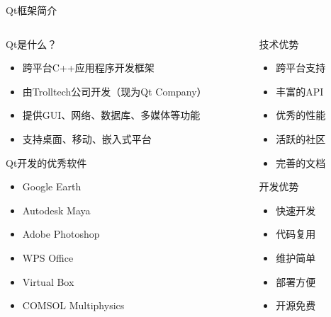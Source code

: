 \documentclass[UTF8,aspectratio=169]{beamer}
\begin{document}
\begin{frame}{Qt框架简介}
    \begin{columns}
        \begin{column}{0.58\textwidth}
    \begin{ytublock}{Qt是什么？}
        \begin{itemize}
            \item 跨平台C++应用程序开发框架
            \item 由Trolltech公司开发（现为Qt Company）
            \item 提供GUI、网络、数据库、多媒体等功能
            \item 支持桌面、移动、嵌入式平台
        \end{itemize}
    \end{ytublock}
    \begin{ytublock}{Qt开发的优秀软件}
        \begin{itemize}
            \item Google Earth
            \item Autodesk Maya
            \item Adobe Photoshop
            \item WPS Office
            \item Virtual Box
            \item COMSOL Multiphysics
        \end{itemize}
    \end{ytublock}
\end{column}
\begin{column}{0.38\textwidth}
    \begin{ytublock}{技术优势}
        \begin{itemize}
            \item 跨平台支持
            \item 丰富的API
            \item 优秀的性能
            \item 活跃的社区
            \item 完善的文档
        \end{itemize}
    \end{ytublock}
    \begin{ytublock}{开发优势}
        \begin{itemize}
            \item 快速开发
            \item 代码复用
            \item 维护简单
            \item 部署方便
            \item 开源免费
        \end{itemize}
    \end{ytublock}
\end{column}
\end{columns}
\end{frame}
\end{document}
